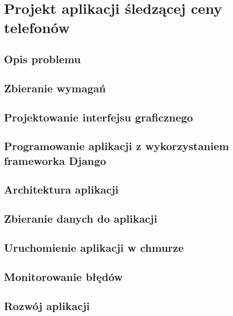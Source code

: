 \chapter{Projekt aplikacji śledzącej ceny telefonów}

\section{Opis problemu}

\section{Zbieranie wymagań}

\section{Projektowanie interfejsu graficznego}

\section{Programowanie aplikacji z wykorzystaniem frameworka Django}

\section{Architektura aplikacji}

\section{Zbieranie danych do aplikacji}

\section{Uruchomienie aplikacji w chmurze}

\section{Monitorowanie błędów}

\section{Rozwój aplikacji}


